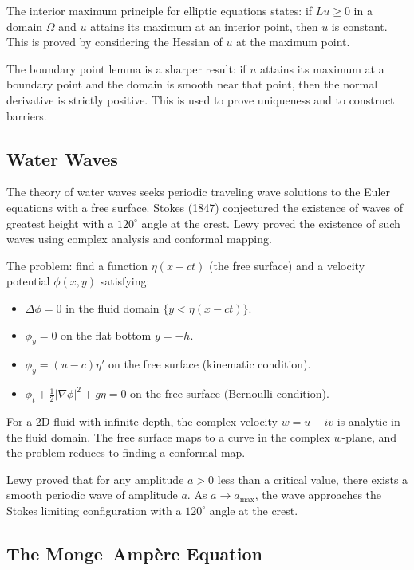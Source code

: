 The interior maximum principle for elliptic equations states: if $Lu \geq 0$ in a domain $\Omega$ and $u$ attains its maximum at an interior point, then $u$ is constant. This is proved by considering the Hessian of $u$ at the maximum point.

The boundary point lemma is a sharper result: if $u$ attains its maximum at a boundary point and the domain is smooth near that point, then the normal derivative is strictly positive. This is used to prove uniqueness and to construct barriers.

\subsection{Water Waves}

The theory of water waves seeks periodic traveling wave solutions to the Euler equations with a free surface. Stokes (1847) conjectured the existence of waves of greatest height with a $120^\circ$ angle at the crest. Lewy proved the existence of such waves using complex analysis and conformal mapping.

The problem: find a function $\eta(x - ct)$ (the free surface) and a velocity potential $\phi(x, y)$ satisfying:
\begin{itemize}
    \item $\Delta \phi = 0$ in the fluid domain $\{y < \eta(x - ct)\}$.
    \item $\phi_y = 0$ on the flat bottom $y = -h$.
    \item $\phi_y = (u - c) \eta'$ on the free surface (kinematic condition).
    \item $\phi_t + \frac12 |\nabla \phi|^2 + g\eta = 0$ on the free surface (Bernoulli condition).
\end{itemize}

For a 2D fluid with infinite depth, the complex velocity $w = u - iv$ is analytic in the fluid domain. The free surface maps to a curve in the complex $w$-plane, and the problem reduces to finding a conformal map.

Lewy proved that for any amplitude $a > 0$ less than a critical value, there exists a smooth periodic wave of amplitude $a$. As $a \to a_{\max}$, the wave approaches the Stokes limiting configuration with a $120^\circ$ angle at the crest.

\subsection{The Monge--Amp\`{e}re Equation}

